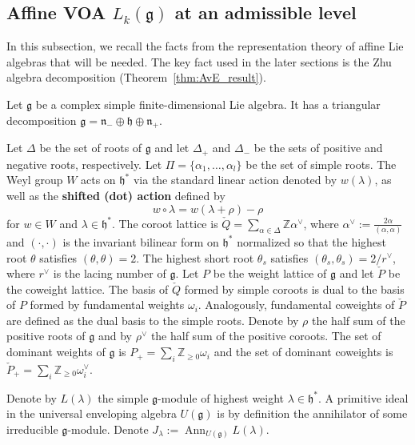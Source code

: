 \documentclass[12pt,a4paper,reqno]{amsart}
\numberwithin{equation}{section}
\theoremstyle{definition}
\newcommand{\g}{\mathfrak{g}}
\newcommand{\Z}{\mathbb{Z}}
\def\la{\lambda}
\def \al{\alpha}
\def \h{\mathfrak{h}}
\def\n{\mathfrak{n}}
\def\ds{\dots}
\begin{document}
\subsection{Affine VOA $L_k(\g)$ at an admissible level}\label{subsec:affineVOA}
In this subsection, we recall the facts from the representation theory of affine Lie algebras that will be needed. The key fact used in the later sections is the Zhu algebra decomposition (Theorem~\ref{thm:AvE_result}).


Let $\g$ be a complex simple finite-dimensional Lie algebra. It has a triangular decomposition $\g = \n_- \oplus \h \oplus \n_+$.


Let $\Delta$ be the set of roots of $\g$ and let $\Delta_+$ and $\Delta_-$ be the sets of positive and negative roots, respectively. Let $\Pi=\{\al_1,\ds, \al_l\}$ be the set of simple roots. The Weyl group $W$ acts on $\h^*$ via the standard linear action denoted by $w(\la)$, as well as the \textbf{shifted (dot) action} defined by
\begin{equation}
    w \circ \la = w(\la + \rho) - \rho
\end{equation}
for $w \in W$ and $\la \in \h^*$. The coroot lattice is $\check{Q} = \sum_{\alpha \in \Delta} \Z \alpha^\vee$, where $\alpha^\vee := \frac{2 \alpha}{(\alpha,\alpha)}$ and $(\cdot,\cdot)$ is the invariant bilinear form on $\h^\ast$ normalized so that the highest root $\theta$ satisfies $(\theta, \theta)=2$. The highest short root $\theta_s$ satisfies $(\theta_s, \theta_s)=2/r^\vee$, where $r^\vee$ is the lacing number of $\g$. Let $P$ be the weight lattice of $\g$ and let $\check{P}$ be the coweight lattice. The basis of $\check{Q}$ formed by simple coroots is dual to the basis of $P$ formed by fundamental weights $\omega_i$. Analogously, fundamental coweights of $\check{P}$ are defined as the dual basis to the simple roots. Denote by $\rho$ the half sum of the positive roots of $\g$ and by $\rho^\vee$ the half sum of the positive coroots. The set of dominant weights of $\g$ is $P_+ = \sum_i \Z_{\ge0} \omega_i$ and the set of dominant coweights is $\check{P}_+ = \sum_i \Z_{\ge0} \omega_i^\vee$.

Denote by $L(\la)$ the simple $\g$-module of highest weight $\la \in \h^\ast$.
A primitive ideal in the universal enveloping algebra $U(\g)$ is by definition the annihilator of some irreducible $\g$-module. Denote $J_\la := \operatorname{Ann}_{U(\g)} L(\la)$.
\end{document}
